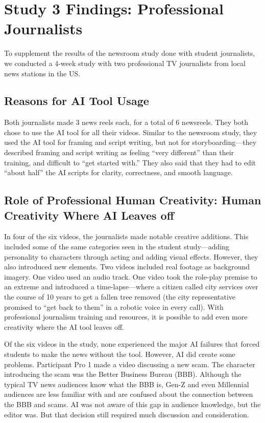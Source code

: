 \section{Study 3 Findings: Professional Journalists}
\label{findings_professionals}

To supplement the results of the newsroom study done with student journalists, we conducted a 4-week study with two professional TV journalists from local news stations in the US. 

\subsection{Reasons for AI Tool Usage} 
Both journalists made 3 news reels each, for a total of 6 newsreels.
They both chose to use the AI tool for all their videos. 
Similar to the newsroom study, they used the AI tool for framing and script writing, but not for storyboarding---they described framing and script writing as feeling ``very different'' than their training, and difficult to ``get started with.'' 
They also said that they had to edit ``about half'' the AI scripts for clarity, correctness, and smooth language.


\subsection{Role of Professional Human Creativity: Human Creativity Where AI Leaves off}

In four of the six videos, the journalists made notable creative additions. 
This included some of the same categories seen in the student study---adding personality to characters through acting and adding visual effects. 
However, they also introduced new elements. 
Two videos included real footage as background imagery. 
One video used an audio track. 
One video took the role-play premise to an extreme and introduced a time-lapse---where a citizen called city services over the course of 10 years to get a fallen tree removed (the city representative promised to ``get back to them'' in a robotic voice in every call). 
With professional journalism training and resources, it is possible to add even more creativity where the AI tool leaves off.

Of the six videos in the study, none experienced the major AI failures that forced students to make the news without the tool.
However, AI did create some problems.
Participant Pro 1 made a video discussing a new scam. 
The character introducing the scam was the Better Business Bureau (BBB). 
Although the typical TV news audiences know what the BBB is, Gen-Z and even Millennial audiences are less familiar with and are confused about the connection between the BBB and scams. 
AI was not aware of this gap in audience knowledge, but the editor was.
But that decision still required much discussion and consideration.


